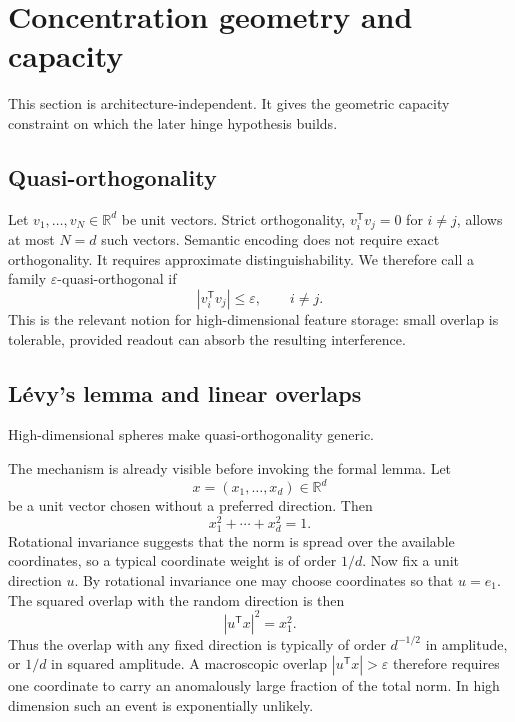 \documentclass[
  aps,
  reprint,
  superscriptaddress,
  floatfix,
  nofootinbib,
  longbibliography
]{revtex4-2}
\newcommand{\R}{\mathbb{R}}
\newcommand{\T}{^{\mathsf{T}}}
\begin{document}
\section{Concentration geometry and capacity}
\label{sec:concentration}

This section is architecture-independent. It gives the geometric
capacity constraint on which the later hinge hypothesis builds.

\subsection{Quasi-orthogonality}
\label{sec:quasiortho}

Let $v_{1},\dots,v_{N}\in\R^{d}$ be unit vectors. Strict orthogonality,
$v_i\T v_j=0$ for $i\neq j$, allows at most $N=d$ such vectors. Semantic
encoding does not require exact orthogonality. It requires approximate
distinguishability. We therefore call a family
$\varepsilon$-quasi-orthogonal if
%
\begin{equation}
\label{eq:quasiortho}
|v_i\T v_j|\le \varepsilon,\qquad i\neq j .
\end{equation}
%
This is the relevant notion for high-dimensional feature storage:
small overlap is tolerable, provided readout can absorb the resulting
interference.

\subsection{L\'evy's lemma and linear overlaps}
\label{sec:levy}

High-dimensional spheres make quasi-orthogonality generic.

The mechanism is already visible before invoking the formal lemma.  Let
\[
        x=(x_1,\ldots,x_d)\in\R^d
\]
be a unit vector chosen without a preferred direction.  Then
\[
        x_1^2+\cdots+x_d^2=1 .
\]
Rotational invariance suggests that the norm is spread over the available
coordinates, so a typical coordinate weight is of order $1/d$.  Now fix a
unit direction $u$.  By rotational invariance one may choose coordinates so
that $u=e_1$.  The squared overlap with the random direction is then
\[
        |u\T x|^2=x_1^2 .
\]
Thus the overlap with any fixed direction is typically of order $d^{-1/2}$
in amplitude, or $1/d$ in squared amplitude.  A macroscopic overlap
$|u\T x|>\varepsilon$ therefore requires one coordinate to carry an
anomalously large fraction of the total norm.  In high dimension such an
event is exponentially unlikely.
\end{document}
